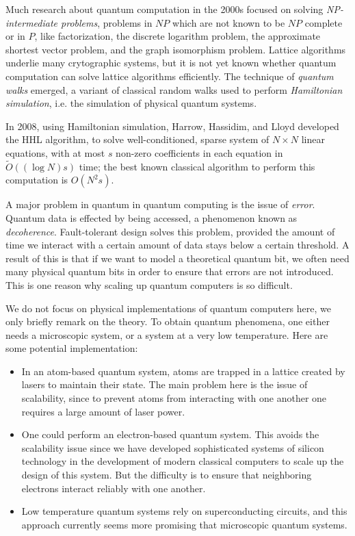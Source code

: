 Much research about quantum computation in the 2000s focused on solving \emph{NP-intermediate problems}, problems in $NP$ which are not known to be $NP$ complete or in $P$, like factorization, the discrete logarithm problem, the approximate shortest vector problem, and the graph isomorphism problem. Lattice algorithms underlie many crytographic systems, but it is not yet known whether quantum computation can solve lattice algorithms efficiently. The technique of \emph{quantum walks} emerged, a variant of classical random walks used to perform \emph{Hamiltonian simulation}, i.e. the simulation of physical quantum systems.

In 2008, using Hamiltonian simulation, Harrow, Hassidim, and Lloyd developed the HHL algorithm, to solve well-conditioned, sparse system of $N \times N$ linear equations, with at most $s$ non-zero coefficients in each equation in $\tilde{O}((\log N)s)$ time; the best known classical algorithm to perform this computation is $O(N^2 s)$.

A major problem in quantum in quantum computing is the issue of \emph{error}. Quantum data is effected by being accessed, a phenomenon known as \emph{decoherence}. Fault-tolerant design solves this problem, provided the amount of time we interact with a certain amount of data stays below a certain threshold. A result of this is that if we want to model a theoretical quantum bit, we often need many physical quantum bits in order to ensure that errors are not introduced. This is one reason why scaling up quantum computers is so difficult.

We do not focus on physical implementations of quantum computers here, we only briefly remark on the theory. To obtain quantum phenomena, one either needs a microscopic system, or a system at a very low temperature. Here are some potential implementation:
%
\begin{itemize}
    \item In an atom-based quantum system, atoms are trapped in a lattice created by lasers to maintain their state. The main problem here is the issue of scalability, since to prevent atoms from interacting with one another one requires a large amount of laser power.

    \item One could perform an electron-based quantum system. This avoids the scalability issue since we have developed sophisticated systems of silicon technology in the development of modern classical computers to scale up the design of this system. But the difficulty is to ensure that neighboring electrons interact reliably with one another.

    \item Low temperature quantum systems rely on superconducting circuits, and this approach currently seems more promising that microscopic quantum systems.
\end{itemize}










